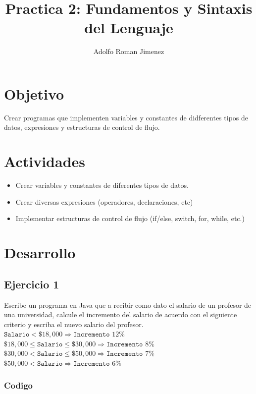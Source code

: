 \documentclass{article}
\title{Practica 2: Fundamentos y Sintaxis del Lenguaje}
\author{Adolfo Roman Jimenez}
\begin{document}
\maketitle

\section{Objetivo}

Crear programas que implementen variables y constantes de didferentes tipos de datos, expresiones y estructuras de control de flujo.

\section{Actividades}

\begin{itemize}
\item Crear variables y constantes de diferentes tipos de datos.
\item Crear diversas expresiones (operadores, declaraciones, etc)
\item Implementar estructuras de control de flujo (if/else, switch, for, while, etc.)
\end{itemize}
\newpage

\section{Desarrollo}

\subsection{Ejercicio 1}
Escribe un programa en Java que a recibir como dato el salario de un profesor de una universidad, calcule el incremento del salario de acuerdo con el siguiente criterio y escriba el nuevo salario del profesor.\\

\noindent $\texttt{Salario} < \$18,000 \Rightarrow \texttt{Incremento }12\%$\\ 
$\$18,000 \leq \texttt{Salario} \leq \$30,000 \Rightarrow \texttt{Incremento }8\%$\\
$\$30,000 < \texttt{Salario} \leq \$50,000 \Rightarrow \texttt{Incremento }7\%$\\
$\$50,000 < \texttt{Salario} \Rightarrow \texttt{Incremento }6\%$\\

\subsubsection{Codigo}
\end{document}
